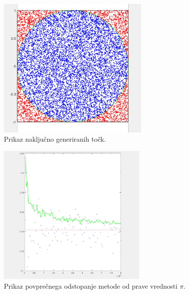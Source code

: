 \documentclass{beamer}
\begin{document}
\begin{frame}{}
    
    \begin{figure}
          \centering
          \includegraphics[height=7cm]{Točke.JPG}
          \caption{Prikaz naključno generiranih točk.}
    \end{figure}

\end{frame}

\begin{frame}

    \begin{figure}[Prikaz naključno generiranih točk]
          \centering
          \includegraphics[height=7cm]{odstopanje.JPG}
          \caption{Prikaz povprečnega odstopanje metode od prave vrednosti $\pi$.}
    \end{figure}

\end{frame}
\end{document}
